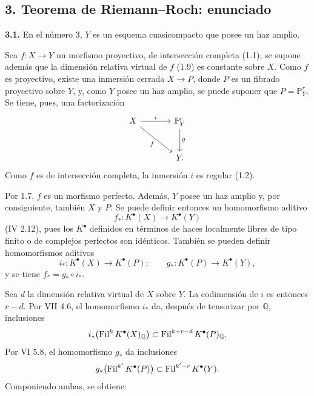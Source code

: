 
\subsection*{3. Teorema de Riemann--Roch: enunciado}

\textbf{3.1.} En el número 3, $Y$ es un esquema cuasicompacto que posee un haz
amplio.

Sea $f:X\to Y$ un morfismo proyectivo, de intersección completa (1.1); se
supone además que la dimensión relativa virtual de $f$ (1.9) es constante sobre
$X$. Como $f$ es proyectivo, existe una inmersión cerrada $X\to P$, donde $P$
es un fibrado proyectivo sobre $Y$, y, como $Y$ posee un haz amplio, se puede
suponer que $P=\mathbb P^r_Y$. Se tiene, pues, una factorización
\[
\begin{tikzcd}[column sep=large,row sep=large]
X \arrow[r,"i"] \arrow[dr,"f"'] & \mathbb P^r_Y \arrow[d,"g"]\\
& Y.
\end{tikzcd}
\]
Como $f$ es de intersección completa, la inmersión $i$ es regular (1.2).

Por 1.7, $f$ es un morfismo perfecto. Además, $Y$ posee un haz amplio y, por
consiguiente, también $X$ y $P$. Se puede definir entonces un homomorfismo
aditivo
\[
f_*:K^{\bullet}(X)\longrightarrow K^{\bullet}(Y)
\]
(IV 2.12), pues los $K^{\bullet}$ definidos en términos de haces localmente
libres de tipo finito o de complejos perfectos son idénticos. También se pueden
definir homomorfismos aditivos
\[
i_*:K^{\bullet}(X)\longrightarrow K^{\bullet}(P);
\qquad
 g_*:K^{\bullet}(P)\longrightarrow K^{\bullet}(Y),
\]
y se tiene $f_*=g_*\circ i_*$.

Sea $d$ la dimensión relativa virtual de $X$ sobre $Y$. La codimensión de $i$
es entonces $r-d$. Por VII 4.6, el homomorfismo $i_*$ da, después de tensorizar
por $\mathbb Q$, inclusiones
\[
i_*\bigl(\operatorname{Fil}^kK^{\bullet}(X)_{\mathbb Q}\bigr)
\subset
\operatorname{Fil}^{k+r-d}K^{\bullet}(P)_{\mathbb Q}.
\]
Por VI 5.8, el homomorfismo $g_*$ da inclusiones
\[
g_*\bigl(\operatorname{Fil}^{k'}K^{\bullet}(P)\bigr)
\subset
\operatorname{Fil}^{k'-r}K^{\bullet}(Y).
\]
Componiendo ambas, se obtiene:

